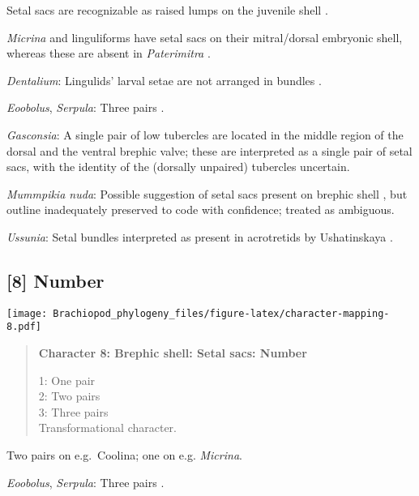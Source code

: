 \documentclass[openany]{book}
\theoremstyle{definition}
\theoremstyle{definition}
\theoremstyle{definition}
\theoremstyle{remark}
\begin{document}
Setal sacs are recognizable as raised lumps on the juvenile shell
\citep[see][]{Bassett2017Earliestontogeny}.

\emph{Micrina} and linguliforms have setal sacs on their mitral/dorsal
embryonic shell, whereas these are absent in \emph{Paterimitra}
\citep{Holmer2011Firstrecord}.

\hypertarget{Dentalium-coding-7}{}
\emph{Dentalium}: Lingulids' larval setae are not arranged in bundles
\citep{Carlson1995Phylogeneticrelationships}.

\hypertarget{Eoobolus-coding-7}{}
\emph{Eoobolus}, \emph{Serpula}: Three pairs
\citep{Carlson1995Phylogeneticrelationships}.

\hypertarget{Gasconsia-coding-7}{}
\emph{Gasconsia}: A single pair of low tubercles are \citep[ state ``may
be'']{Ushatinskaya2016Revisionof} located in the middle region of the
dorsal and the ventral brephic valve; these are interpreted as a single
pair of setal sacs, with the identity of the (dorsally unpaired)
tubercles uncertain.

\hypertarget{Mummpikia_nuda-coding-7}{}
\emph{Mummpikia nuda}: Possible suggestion of setal sacs present on
brephic shell \citep{Holmer1997EarlyCambrian, Li2004}, but outline
inadequately preserved to code with confidence; treated as ambiguous.

\hypertarget{Ussunia-coding-7}{}
\emph{Ussunia}: Setal bundles interpreted as present in acrotretids by
Ushatinskaya \citeyearpar{Ushatinskaya2016Protegulumand}.

\subsection*{{[}8{]} Number}\label{number}

\texttt{[image: Brachiopod\_phylogeny\_files/figure-latex/character-mapping-8.pdf]}

\begin{quote}
\textbf{Character 8: Brephic shell: Setal sacs: Number}

1: One pair\\
2: Two pairs\\
3: Three pairs\\
Transformational character.
\end{quote}

Two pairs on e.g.~Coolina; one on e.g. \emph{Micrina}.

\hypertarget{Eoobolus-coding-8}{}
\emph{Eoobolus}, \emph{Serpula}: Three pairs
\citep{Carlson1995Phylogeneticrelationships}.
\end{document}
